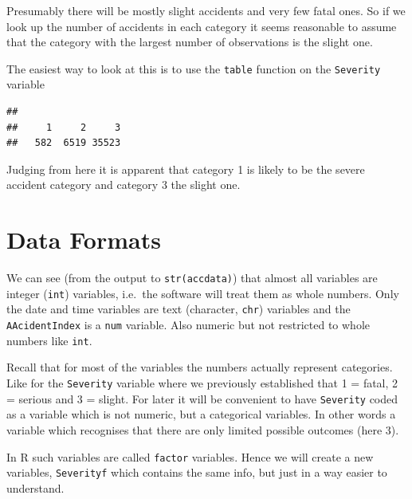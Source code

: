 \documentclass[
]{article}
\newenvironment{Shaded}{\begin{snugshade}}{\end{snugshade}}
\newcommand{\CommentTok}[1]{\textcolor[rgb]{0.56,0.35,0.01}{\textit{#1}}}
\newcommand{\FunctionTok}[1]{\textcolor[rgb]{0.13,0.29,0.53}{\textbf{#1}}}
\newcommand{\NormalTok}[1]{#1}
\newcommand{\OtherTok}[1]{\textcolor[rgb]{0.56,0.35,0.01}{#1}}
\newcommand{\SpecialCharTok}[1]{\textcolor[rgb]{0.81,0.36,0.00}{\textbf{#1}}}
\newcommand{\StringTok}[1]{\textcolor[rgb]{0.31,0.60,0.02}{#1}}
\begin{document}
Presumably there will be mostly slight accidents and very few fatal
ones. So if we look up the number of accidents in each category it seems
reasonable to assume that the category with the largest number of
observations is the slight one.

The easiest way to look at this is to use the \texttt{table} function on
the \texttt{Severity} variable

\begin{Shaded}
\end{Shaded}

\begin{verbatim}
## 
##     1     2     3 
##   582  6519 35523
\end{verbatim}

Judging from here it is apparent that category 1 is likely to be the
severe accident category and category 3 the slight one.

\hypertarget{data-formats}{%
\section{Data Formats}\label{data-formats}}

We can see (from the output to \texttt{str(accdata)}) that almost all
variables are integer (\texttt{int}) variables, i.e.~the software will
treat them as whole numbers. Only the date and time variables are text
(character, \texttt{chr}) variables and the \texttt{AAcidentIndex} is a
\texttt{num} variable. Also numeric but not restricted to whole numbers
like \texttt{int}.

Recall that for most of the variables the numbers actually represent
categories. Like for the \texttt{Severity} variable where we previously
established that 1 = fatal, 2 = serious and 3 = slight. For later it
will be convenient to have \texttt{Severity} coded as a variable which
is not numeric, but a categorical variables. In other words a variable
which recognises that there are only limited possible outcomes (here 3).

In R such variables are called \texttt{factor} variables. Hence we will
create a new variables, \texttt{Severityf} which contains the same info,
but just in a way easier to understand.

\begin{Shaded}
\end{Shaded}
\end{document}

